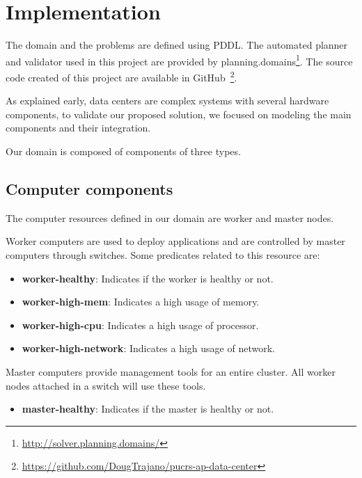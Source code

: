 \documentclass[letterpaper]{article}
\begin{document}
\section{Implementation}\label{sec:implementation}

The domain and the problems are defined using PDDL. The automated planner and validator used in this project are provided by planning.domains\footnote{\url{http://solver.planning.domains/}}. The source code created of this project are available in GitHub~\footnote{\url{https://github.com/DougTrajano/pucrs-ap-data-center}}.

As explained early, data centers are complex systems with several hardware components, to validate our proposed solution, we focused on modeling the main components and their integration.

Our domain is composed of components of three types.

\subsection{Computer components}\label{sec:implementation1}

The computer resources defined in our domain are worker and master nodes.

Worker computers are used to deploy applications and are controlled by master computers through switches. Some predicates related to this resource are:

\begin{itemize}
    \item \textbf{worker-healthy}: Indicates if the worker is healthy or not.
    \item \textbf{worker-high-mem}: Indicates a high usage of memory.
    \item \textbf{worker-high-cpu}: Indicates a high usage of processor.
    \item \textbf{worker-high-network}: Indicates a high usage of network.
\end{itemize}

Master computers provide management tools for an entire cluster. All worker nodes attached in a switch will use these tools. 

\begin{itemize}
    \item \textbf{master-healthy}: Indicates if the master is healthy or not.
\end{itemize}
\end{document}
